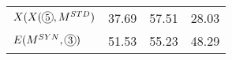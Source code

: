 \begin{table}[]
\begin{tabular}{@{\makebox[1.50em][l]{\rownumber\space}}lccc@{}}
%
%
$X(X(\circlednumber{5}, M^{STD})$  & 37.69           & 57.51           & 28.03\\ 
%
\gdef\rownumber{\circlednumber{\stepcounter{magicrownumbers}\arabic{magicrownumbers}}}%
$E(M^{SYN}, \circlednumber{3})$      & 51.53	&	55.23	&	48.29          \\ 


\end{tabular}
\end{table}
